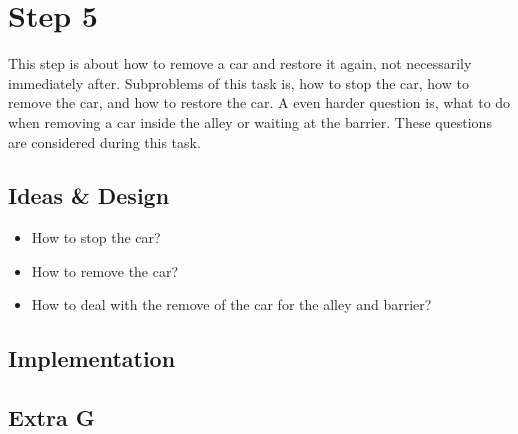 \section{Step 5}
This step is about how to remove a car and restore it again, not necessarily immediately after. Subproblems of this task is, how to stop the car, how to remove the car, and how to restore the car. A even harder question is, what to do when removing a car inside the alley or waiting at the barrier. These questions are considered during this task.

\subsection{Ideas \& Design}


\begin{itemize}
\item How to stop the car?
\item How to remove the car?
\item How to deal with the remove of the car for the alley and barrier?
\end{itemize}

\subsection{Implementation}


\subsection{Extra G}
